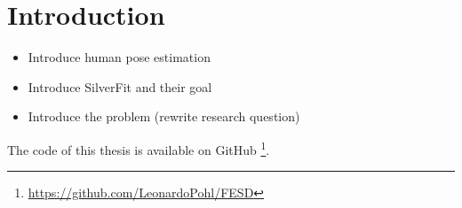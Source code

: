 \chapter{Introduction}
\setcounter{page}{1}

\begin{itemize}
  \item Introduce human pose estimation
  \item Introduce SilverFit and their goal
  \item Introduce the problem (rewrite research question)
\end{itemize}

The code of this thesis is available on GitHub \footnote{\url{https://github.com/LeonardoPohl/FESD}}.




